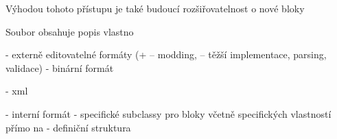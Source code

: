 Výhodou tohoto přístupu je také budoucí rozšiřovatelnost o nové bloky

Soubor obsahuje popis vlastno

- externě editovatelné formáty (+ -- modding, -- těžší implementace, parsing, validace)
- binární formát

- xml


- interní formát
- specifické subclassy pro bloky včetně specifických vlastností přímo na 
- definiční struktura





